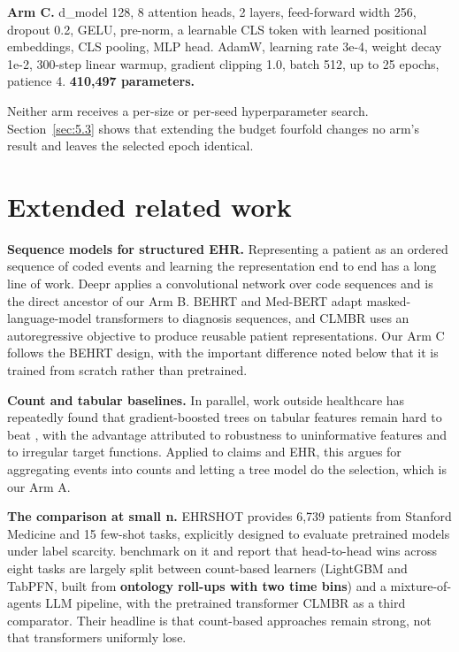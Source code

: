 \documentclass[10pt,twocolumn,letterpaper]{article}
\begin{document}
\textbf{Arm C.} d\_model 128, 8 attention heads, 2 layers, feed-forward width 256, dropout 0.2, GELU, pre-norm, a learnable CLS token with learned positional embeddings, CLS pooling, MLP head. AdamW, learning rate 3e-4, weight decay 1e-2, 300-step linear warmup, gradient clipping 1.0, batch 512, up to 25 epochs, patience 4. \textbf{410,497 parameters.}



Neither arm receives a per-size or per-seed hyperparameter search. Section~\ref{sec:5.3} shows that extending the budget fourfold changes no arm's result and leaves the selected epoch identical.



\section{Extended related work}



\textbf{Sequence models for structured EHR.} Representing a patient as an ordered sequence of coded events and learning the representation end to end has a long line of work. Deepr \citep{nguyen2017deepr} applies a convolutional network over code sequences and is the direct ancestor of our Arm B. BEHRT \citep{li2020behrt} and Med-BERT \citep{rasmy2021medbert} adapt masked-language-model transformers to diagnosis sequences, and CLMBR \citep{steinberg2021clmbr} uses an autoregressive objective to produce reusable patient representations. Our Arm C follows the BEHRT design, with the important difference noted below that it is trained from scratch rather than pretrained.



\textbf{Count and tabular baselines.} In parallel, work outside healthcare has repeatedly found that gradient-boosted trees on tabular features remain hard to beat \citep{shwartzziv2022tabular,grinsztajn2022trees}, with the advantage attributed to robustness to uninformative features and to irregular target functions. Applied to claims and EHR, this argues for aggregating events into counts and letting a tree model do the selection, which is our Arm A.



\textbf{The comparison at small n.} EHRSHOT \citep{wornow2023ehrshot} provides 6,739 patients from Stanford Medicine and 15 few-shot tasks, explicitly designed to evaluate pretrained models under label scarcity. \citet{gao2025countbased} benchmark on it and report that head-to-head wins across eight tasks are largely split between count-based learners (LightGBM and TabPFN, built from \textbf{ontology roll-ups with two time bins}) and a mixture-of-agents LLM pipeline, with the pretrained transformer CLMBR as a third comparator. Their headline is that count-based approaches remain strong, not that transformers uniformly lose.
\end{document}
